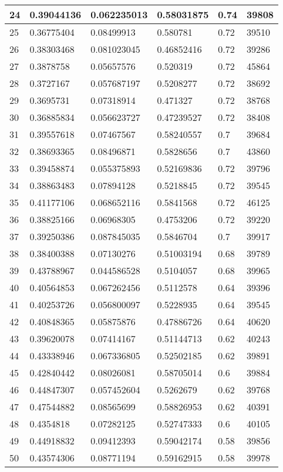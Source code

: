 \begin{longtable}{|l|l|l|l|l|l|}
24 & 0.39044136 & 0.062235013 & 0.58031875 & 0.74 & 39808 \\ \hline 
25 & 0.36775404 & 0.08499913 & 0.580781 & 0.72 & 39510 \\ \hline 
26 & 0.38303468 & 0.081023045 & 0.46852416 & 0.72 & 39286 \\ \hline 
27 & 0.3878758 & 0.05657576 & 0.520319 & 0.72 & 45864 \\ \hline 
28 & 0.3727167 & 0.057687197 & 0.5208277 & 0.72 & 38692 \\ \hline 
29 & 0.3695731 & 0.07318914 & 0.471327 & 0.72 & 38768 \\ \hline 
30 & 0.36885834 & 0.056623727 & 0.47239527 & 0.72 & 38408 \\ \hline 
31 & 0.39557618 & 0.07467567 & 0.58240557 & 0.7 & 39684 \\ \hline 
32 & 0.38693365 & 0.08496871 & 0.5828656 & 0.7 & 43860 \\ \hline 
33 & 0.39458874 & 0.055375893 & 0.52169836 & 0.72 & 39796 \\ \hline 
34 & 0.38863483 & 0.07894128 & 0.5218845 & 0.72 & 39545 \\ \hline 
35 & 0.41177106 & 0.068652116 & 0.5841568 & 0.72 & 46125 \\ \hline 
36 & 0.38825166 & 0.06968305 & 0.4753206 & 0.72 & 39220 \\ \hline 
37 & 0.39250386 & 0.087845035 & 0.5846704 & 0.7 & 39917 \\ \hline 
38 & 0.38400388 & 0.07130276 & 0.51003194 & 0.68 & 39789 \\ \hline 
39 & 0.43788967 & 0.044586528 & 0.5104057 & 0.68 & 39965 \\ \hline 
40 & 0.40564853 & 0.067262456 & 0.5112578 & 0.64 & 39396 \\ \hline 
41 & 0.40253726 & 0.056800097 & 0.5228935 & 0.64 & 39545 \\ \hline 
42 & 0.40848365 & 0.05875876 & 0.47886726 & 0.64 & 40620 \\ \hline 
43 & 0.39620078 & 0.07414167 & 0.51144713 & 0.62 & 40243 \\ \hline 
44 & 0.43338946 & 0.067336805 & 0.52502185 & 0.62 & 39891 \\ \hline 
45 & 0.42840442 & 0.08026081 & 0.58705014 & 0.6 & 39884 \\ \hline 
46 & 0.44847307 & 0.057452604 & 0.5262679 & 0.62 & 39768 \\ \hline 
47 & 0.47544882 & 0.08565699 & 0.58826953 & 0.62 & 40391 \\ \hline 
48 & 0.4354818 & 0.07282125 & 0.52747333 & 0.6 & 40105 \\ \hline 
49 & 0.44918832 & 0.09412393 & 0.59042174 & 0.58 & 39856 \\ \hline 
50 & 0.43574306 & 0.08771194 & 0.59162915 & 0.58 & 39978 \\ \hline 
\end{longtable}
